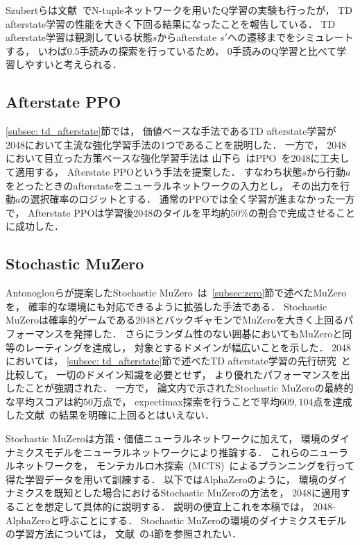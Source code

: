 Szubertらは文献~\cite{Szubert}でN-tupleネットワークを用いたQ学習の実験も行ったが， TD afterstate学習の性能を大きく下回る結果になったことを報告している．
TD afterstate学習は観測している状態$s$からafterstate $s'$への遷移までをシミュレートする， いわば$0.5$手読みの探索を行っているため， $0$手読みのQ学習と比べて学習しやすいと考えられる．

\subsection{Afterstate PPO}
\ref{subsec: td_afterstate}節では， 価値ベースな手法であるTD afterstate学習が2048において主流な強化学習手法の$1$つであることを説明した．
一方で， 2048において目立った方策ベースな強化学習手法は
山下ら~\cite{afterstate_ppo}はPPO~\cite{PPO}を2048に工夫して適用する， Afterstate PPOという手法を提案した．
すなわち状態$s$から行動$a$をとったときのafterstateをニューラルネットワークの入力とし， その出力を行動$a$の選択確率のロジットとする．
通常のPPOでは全く学習が進まなかった一方で， Afterstate PPOは学習後2048のタイルを平均約$50\%$の割合で完成させることに成功した．

\subsection{Stochastic MuZero}
\label{subsec: stochastic_muzero}
Antonoglouらが提案したStochastic MuZero~\cite{StochasticMuZero}は~\ref{subsec:zero}節で述べたMuZeroを， 確率的な環境にも対応できるように拡張した手法である．
Stochastic MuZeroは確率的ゲームである2048とバックギャモンでMuZeroを大きく上回るパフォーマンスを発揮した．
さらにランダム性のない囲碁においてもMuZeroと同等のレーティングを達成し， 対象とするドメインが幅広いことを示した．
2048においては， \ref{subsec: td_afterstate}節で述べたTD afterstate学習の先行研究~\cite{DBLP:journals/corr/Jaskowski16}と比較して， 一切のドメイン知識を必要とせず， より優れたパフォーマンスを出したことが強調された．
一方で， 論文内で示されたStochastic MuZeroの最終的な平均スコアは約$50$万点で， expectimax探索を行うことで平均$609,104$点を達成した文献~\cite{DBLP:journals/corr/Jaskowski16}の結果を明確に上回るとはいえない．

Stochastic MuZeroは方策・価値ニューラルネットワークに加えて， 環境のダイナミクスモデルをニューラルネットワークにより推論する．
これらのニューラルネットワークを， モンテカルロ木探索~(MCTS)~によるプランニングを行って得た学習データを用いて訓練する．
以下ではAlphaZeroのように， 環境のダイナミクスを既知とした場合におけるStochastic MuZeroの方法を， 2048に適用することを想定して具体的に説明する．
説明の便宜上これを本稿では， 2048-AlphaZeroと呼ぶことにする．
Stochastic MuZeroの環境のダイナミクスモデルの学習方法については， 文献~\cite{StochasticMuZero}の$4$節を参照されたい．

